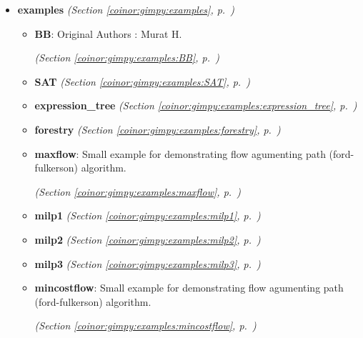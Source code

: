 \begin{itemize}
\setlength{\parskip}{0ex}
\item \textbf{examples}
  \textit{(Section \ref{coinor:gimpy:examples}, p.~\pageref{coinor:gimpy:examples})}

  \begin{itemize}
\setlength{\parskip}{0ex}
    \item \textbf{BB}: 
Original Authors : Murat H. 


  \textit{(Section \ref{coinor:gimpy:examples:BB}, p.~\pageref{coinor:gimpy:examples:BB})}

    \item \textbf{SAT}
  \textit{(Section \ref{coinor:gimpy:examples:SAT}, p.~\pageref{coinor:gimpy:examples:SAT})}

    \item \textbf{expression\_tree}
  \textit{(Section \ref{coinor:gimpy:examples:expression_tree}, p.~\pageref{coinor:gimpy:examples:expression_tree})}

    \item \textbf{forestry}
  \textit{(Section \ref{coinor:gimpy:examples:forestry}, p.~\pageref{coinor:gimpy:examples:forestry})}

    \item \textbf{maxflow}: Small example for demonstrating flow agumenting path (ford-fulkerson) 
algorithm.



  \textit{(Section \ref{coinor:gimpy:examples:maxflow}, p.~\pageref{coinor:gimpy:examples:maxflow})}

    \item \textbf{milp1}
  \textit{(Section \ref{coinor:gimpy:examples:milp1}, p.~\pageref{coinor:gimpy:examples:milp1})}

    \item \textbf{milp2}
  \textit{(Section \ref{coinor:gimpy:examples:milp2}, p.~\pageref{coinor:gimpy:examples:milp2})}

    \item \textbf{milp3}
  \textit{(Section \ref{coinor:gimpy:examples:milp3}, p.~\pageref{coinor:gimpy:examples:milp3})}

    \item \textbf{mincostflow}: Small example for demonstrating flow agumenting path (ford-fulkerson) 
algorithm.



  \textit{(Section \ref{coinor:gimpy:examples:mincostflow}, p.~\pageref{coinor:gimpy:examples:mincostflow})}


\end{itemize}
\end{itemize}
